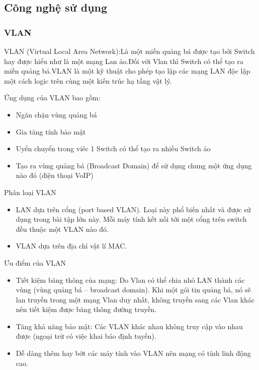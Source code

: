 \documentclass[a4paper]{article}
\begin{document}
\subsection{Công nghệ sử dụng}
\subsubsection{VLAN}
VLAN (Virtual Local Area Network):Là một miền quảng bá được tạo bởi Switch hay được hiểu như là một mạng Lan ảo.Đối với Vlan thì Switch có thể tạo ra miền quảng bá.VLAN là một kỹ thuật cho phép tạo lập các mạng LAN độc lập một cách logic trên cùng một kiến trúc hạ tầng vật lý.

Ứng dụng của VLAN bao gồm:
    \begin{itemize}
        \item Ngăn chặn vùng quảng bá
        \item Gia tăng tính bảo mật
        \item Uyển chuyển trong viêc 1 Switch có thể tạo ra nhiều Switch ảo
        \item Tạo ra vùng quảng bá (Broadcast Domain) để sử dụng chung một ứng dụng nào đó (điện thoại VoIP)
    \end{itemize}

Phân loại VLAN
    \begin{itemize}
        \item LAN dựa trên cổng (port based VLAN). Loại này phổ biến nhất và được sử dụng trong bài tập lớn này. Mỗi máy tính kết nối tới một cổng trên switch đều thuộc một VLAN nào đó.
        \item VLAN dựa trên địa chỉ vật lí MAC.
    \end{itemize}
    
Ưu điểm của VLAN
    \begin{itemize}
        \item Tiết kiệm băng thông của mạng: Do Vlan có thể chia nhỏ LAN thành các vùng (vùng quảng bá – broadcast domain). Khi một gói tin quảng bá, nó sẽ lan truyền trong một mạng Vlan duy nhất, không truyền sang các Vlan khác nên tiết kiệm được băng thông đường truyền.
        \item Tăng khả năng bảo mật: Các VLAN khác nhau không truy cập vào nhau được (ngoại trừ có việc khai báo định tuyến).
        \item Dễ dàng thêm hay bớt các máy tính vào VLAN nên mạng có tính linh động cao.
    \end{itemize}
\end{document}
